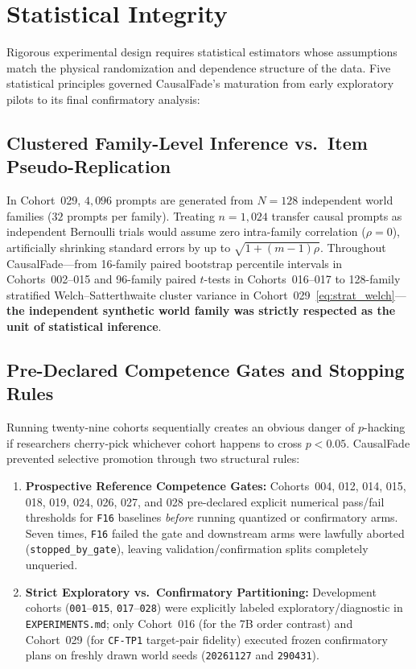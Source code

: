 \chapter{Statistical Integrity}\label{ch:statistical_integrity}

Rigorous experimental design requires statistical estimators whose assumptions match the physical randomization and dependence structure of the data. Five statistical principles governed CausalFade's maturation from early exploratory pilots to its final confirmatory analysis:

\section{Clustered Family-Level Inference vs.\ Item Pseudo-Replication}
In Cohort~029, $4{,}096$ prompts are generated from $N=128$ independent world families ($32$ prompts per family). Treating $n=1{,}024$ transfer causal prompts as independent Bernoulli trials would assume zero intra-family correlation ($\rho = 0$), artificially shrinking standard errors by up to $\sqrt{1 + (m-1)\rho}$. Throughout CausalFade---from 16-family paired bootstrap percentile intervals in Cohorts~002--015 and 96-family paired $t$-tests in Cohorts~016--017 to 128-family stratified Welch--Satterthwaite cluster variance in Cohort~029~\eqref{eq:strat_welch}---\textbf{the independent synthetic world family was strictly respected as the unit of statistical inference}.

\section{Pre-Declared Competence Gates and Stopping Rules}
Running twenty-nine cohorts sequentially creates an obvious danger of $p$-hacking if researchers cherry-pick whichever cohort happens to cross $p < 0.05$. CausalFade prevented selective promotion through two structural rules:
\begin{enumerate}
  \item \textbf{Prospective Reference Competence Gates:} Cohorts~004, 012, 014, 015, 018, 019, 024, 026, 027, and 028 pre-declared explicit numerical pass/fail thresholds for \texttt{F16} baselines \emph{before} running quantized or confirmatory arms. Seven times, \texttt{F16} failed the gate and downstream arms were lawfully aborted (\texttt{stopped\_by\_gate}), leaving validation/confirmation splits completely unqueried.
  \item \textbf{Strict Exploratory vs.\ Confirmatory Partitioning:} Development cohorts (\texttt{001}--\texttt{015}, \texttt{017}--\texttt{028}) were explicitly labeled exploratory/diagnostic in \texttt{EXPERIMENTS.md}; only Cohort~016 (for the 7B order contrast) and Cohort~029 (for \texttt{CF-TP1} target-pair fidelity) executed frozen confirmatory plans on freshly drawn world seeds (\texttt{20261127} and \texttt{290431}).
\end{enumerate}

